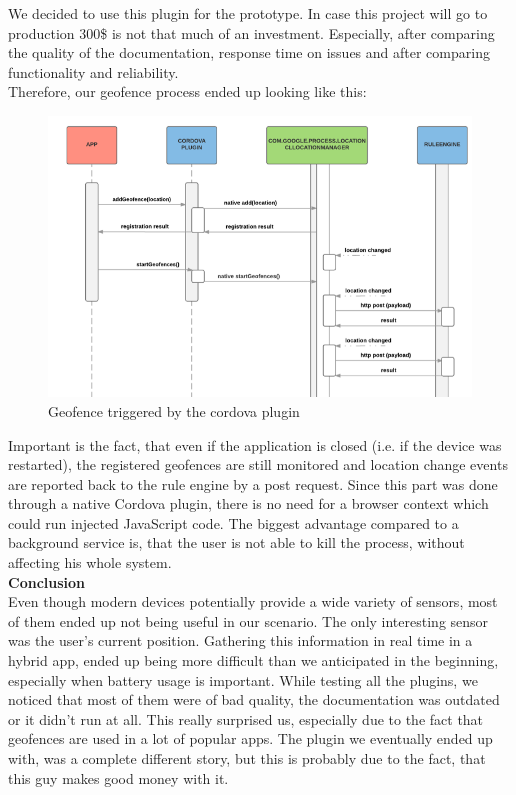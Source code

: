 \documentclass[11pt]{article} %
\begin{document}
We decided to use this plugin for the prototype. In case this project will go to production 300\$ is not that much of an investment. Especially, after comparing the quality of the documentation, response time on issues and after comparing functionality and reliability.\\
\newpage
Therefore, our geofence process ended up looking like this:

\begin{figure}[H]
\begin{center}
\includegraphics[]{geofence_process}
\end{center}
\caption{Geofence triggered by the cordova plugin}
\label{fig:geofence_process}
\end{figure}

\vspace{0.5cm}


Important is the fact, that even if the application is closed (i.e. if the device was restarted), the registered geofences are still monitored and location change events are reported back to the rule engine by a post request. Since this part was done through a native Cordova plugin, there is no need for a browser context which could run injected JavaScript code. The biggest advantage compared to a background service is, that the user is not able to kill the process, without affecting his whole system.\\

\textbf{Conclusion}\\

Even though modern devices potentially provide a wide variety of sensors, most of them ended up not being useful in our scenario. The only interesting sensor was the user’s current position. Gathering this information in real time in a hybrid app, ended up being more difficult than we anticipated in the beginning, especially when battery usage is important. While testing all the plugins, we noticed that most of them were of bad quality, the documentation was outdated or it didn’t run at all. This really surprised us, especially due to the fact that geofences are used in a lot of popular apps. The plugin we eventually ended up with, was a complete different story, but this is probably due to the fact, that this guy makes good money with it.
\end{document}
